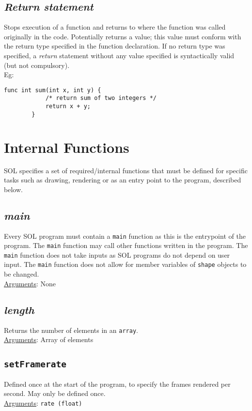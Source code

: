 \documentclass[letterpaper,12pt]{article}
\begin{document}
\subsection{\textit{Return statement}}
Stops execution of a function and returns to where the function was called originally in the code. Potentially returns a value; this value must conform with the return type specified in the function declaration. If no return type was specified, a \textit{return} statement without any value specified is syntactically valid (but not compulsory).\\
Eg: \begin{lstlisting}[aboveskip=-13pt]
        func int sum(int x, int y) {
            /* return sum of two integers */
            return x + y;
        }
    \end{lstlisting}

\section{Internal Functions} \label{internal}
SOL specifies a set of required/internal functions that must be defined for specific tasks such as drawing, rendering or as an entry point to the program, described below.

\subsection{\textit{main}}
Every SOL program must contain a \texttt{main} function as this is the entrypoint of the program. The \texttt{main} function may call other functions written in the program. The \texttt{main} function does not take inputs as SOL programs do not depend on user input. The \texttt{main} function does not allow for member variables of \texttt{shape} objects to be changed.\\
\underline{Arguments}: None

\subsection{\textit{length}}
Returns the number of elements in an \texttt{array}.\\
\underline{Arguments}: Array of elements

\subsection{\texttt{setFramerate}}
Defined once at the start of the program, to specify the frames rendered per second. May only be defined once.\\
\underline{Arguments}: \texttt{rate (float)}
\end{document}
